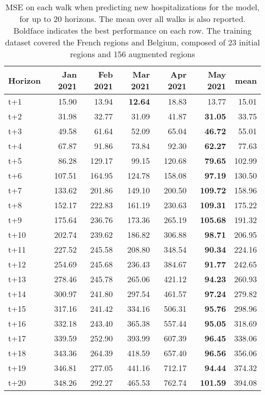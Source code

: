 \begin{table}[H]
\centering
\caption{MSE on each walk when predicting new hospitalizations for the model, for up to 20 horizons. The mean over all walks is also reported. Boldface indicates the best performance on each row. The training dataset covered the French regions and Belgium, composed of 23 initial regions and 156 augmented regions }
\label{tab:MSE_walk_baseline}
\begin{tabular}{lrrrrrr}
\toprule
Horizon &  Jan 2021 &  Feb 2021 &  Mar 2021 &  Apr 2021 &  May 2021 &   mean \\
\midrule
t+1  & 15.90  & 13.94  & \textbf{12.64}  & 18.83  & 13.77  & 15.01  \\
t+2  & 31.98  & 32.77  & 31.09  & 41.87  & \textbf{31.05}  & 33.75  \\
t+3  & 49.58  & 61.64  & 52.09  & 65.04  & \textbf{46.72}  & 55.01  \\
t+4  & 67.87  & 91.86  & 73.84  & 92.30  & \textbf{62.27}  & 77.63  \\
t+5  & 86.28  & 129.17  & 99.15  & 120.68  & \textbf{79.65}  & 102.99  \\
t+6  & 107.51  & 164.95  & 124.78  & 158.08  & \textbf{97.19}  & 130.50  \\
t+7  & 133.62  & 201.86  & 149.10  & 200.50  & \textbf{109.72}  & 158.96  \\
t+8  & 152.17  & 222.83  & 161.19  & 230.63  & \textbf{109.31}  & 175.22  \\
t+9  & 175.64  & 236.76  & 173.36  & 265.19  & \textbf{105.68}  & 191.32  \\
t+10  & 202.74  & 239.62  & 186.82  & 306.88  & \textbf{98.71}  & 206.95  \\
t+11  & 227.52  & 245.58  & 208.80  & 348.54  & \textbf{90.34}  & 224.16  \\
t+12  & 254.69  & 245.68  & 236.43  & 384.67  & \textbf{91.77}  & 242.65  \\
t+13  & 278.46  & 245.78  & 265.06  & 421.12  & \textbf{94.23}  & 260.93  \\
t+14  & 300.97  & 241.80  & 297.54  & 461.57  & \textbf{97.24}  & 279.82  \\
t+15  & 317.16  & 241.42  & 334.16  & 506.31  & \textbf{95.76}  & 298.96  \\
t+16  & 332.18  & 243.40  & 365.38  & 557.44  & \textbf{95.05}  & 318.69  \\
t+17  & 339.59  & 252.90  & 393.99  & 607.39  & \textbf{96.45}  & 338.06  \\
t+18  & 343.36  & 264.39  & 418.59  & 657.40  & \textbf{96.56}  & 356.06  \\
t+19  & 346.81  & 277.05  & 441.16  & 712.17  & \textbf{94.44}  & 374.32  \\
t+20  & 348.26  & 292.27  & 465.53  & 762.74  & \textbf{101.59}  & 394.08  \\

\bottomrule
\end{tabular}
\end{table}
